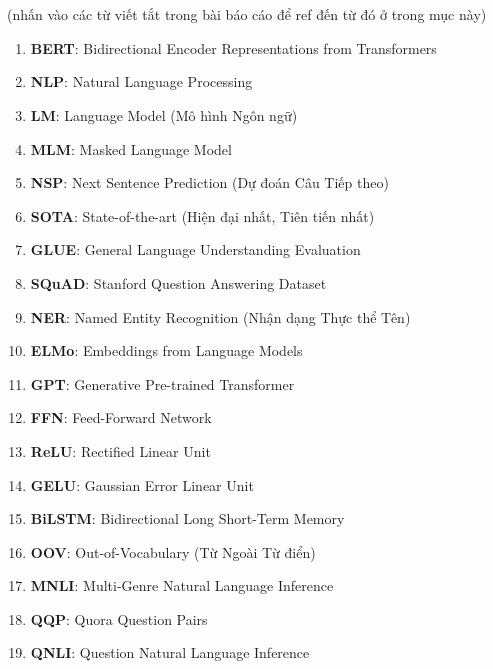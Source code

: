 \section*{\acronymsname} \label{danh-muc-thuat-ngu-viet-tat}
(nhấn vào các từ viết tắt trong bài báo cáo để ref đến từ đó ở trong mục này)
\begin{enumerate}[label=--, wide, labelindent=0pt]
    \item \textbf{BERT}: Bidirectional Encoder Representations from Transformers \label{acro:bert}
    \item \textbf{NLP}: Natural Language Processing \label{acro:nlp}
    \item \textbf{LM}: Language Model (Mô hình Ngôn ngữ) \label{acro:lm}
    \item \textbf{MLM}: Masked Language Model  \label{acro:mlm}
    \item \textbf{NSP}: Next Sentence Prediction (Dự đoán Câu Tiếp theo) \label{acro:nsp}
    \item \textbf{SOTA}: State-of-the-art (Hiện đại nhất, Tiên tiến nhất) \label{acro:sota}
    \item \textbf{GLUE}: General Language Understanding Evaluation \label{acro:glue}
    \item \textbf{SQuAD}: Stanford Question Answering Dataset \label{acro:squad}
    \item \textbf{NER}: Named Entity Recognition (Nhận dạng Thực thể Tên) \label{acro:ner}
    \item \textbf{ELMo}: Embeddings from Language Models \label{acro:elmo}
    \item \textbf{GPT}: Generative Pre-trained Transformer \label{acro:gpt}
    \item \textbf{FFN}: Feed-Forward Network \label{acro:ffn}
    \item \textbf{ReLU}: Rectified Linear Unit \label{acro:relu}
    \item \textbf{GELU}: Gaussian Error Linear Unit \label{acro:gelu}
    \item \textbf{BiLSTM}: Bidirectional Long Short-Term Memory \label{acro:bilstm}
    \item \textbf{OOV}: Out-of-Vocabulary (Từ Ngoài Từ điển) \label{acro:oov}
    \item \textbf{MNLI}: Multi-Genre Natural Language Inference \label{acro:mnli}
    \item \textbf{QQP}: Quora Question Pairs \label{acro:qqp}
    \item \textbf{QNLI}: Question Natural Language Inference \label{acro:qnli}

\end{enumerate}
